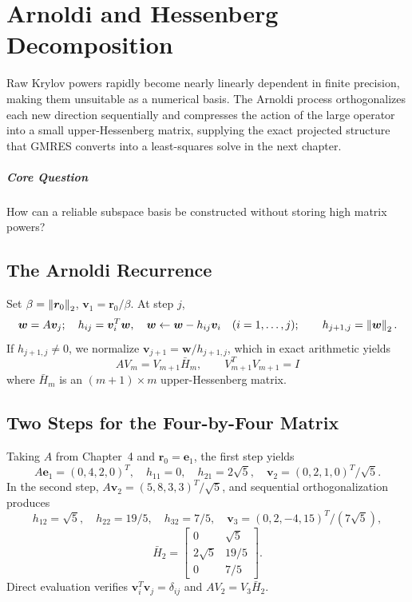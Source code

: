 \chapter{Arnoldi and Hessenberg Decomposition}\label{v0ch:11}
\begin{chaptersummary}
Raw Krylov powers rapidly become nearly linearly dependent in finite precision, making them unsuitable as a numerical basis. The Arnoldi process orthogonalizes each new direction sequentially and compresses the action of the large operator into a small upper-Hessenberg matrix, supplying the exact projected structure that GMRES converts into a least-squares solve in the next chapter.
\end{chaptersummary}
\paragraph{Core Question}How can a reliable subspace basis be constructed without storing high matrix powers?

\section{The Arnoldi Recurrence}
Set $\beta=\left\lVert \bm r_0\right\rVert_2$, $\bm v_1=\bm r_0/\beta$. At step $j$,
\[
 \bm w=A\bm v_j;\quad
 h_{ij}=\bm v_i^T\bm w,\quad
 \bm w\leftarrow\bm w-h_{ij}\bm v_i\quad(i=1,\ldots,j);
 \qquad h_{j+1,j}=\left\lVert \bm w\right\rVert_2.
\]
If $h_{j+1,j}\ne0$, we normalize $\bm v_{j+1}=\bm w/h_{j+1,j}$, which in exact arithmetic yields
\[
 AV_m=V_{m+1}\bar H_m,\qquad V_{m+1}^TV_{m+1}=I
\]
where $\bar H_m$ is an $(m+1)\times m$ upper-Hessenberg matrix.
\section{Two Steps for the Four-by-Four Matrix}
Taking $A$ from Chapter~4 and $\bm r_0=\bm e_1$, the first step yields
\[
 A\bm e_1=(0,4,2,0)^T,\quad h_{11}=0,\quad
 h_{21}=2\sqrt5,\quad
 \bm v_2=(0,2,1,0)^T/\sqrt5.
\]
In the second step, $A\bm v_2=(5,8,3,3)^T/\sqrt5$, and sequential orthogonalization produces
\[
 h_{12}=\sqrt5,\quad h_{22}=19/5,\quad
 h_{32}=7/5,\quad
 \bm v_3=(0,2,-4,15)^T/(7\sqrt5),
\]
\[
 \bar H_2=\begin{bmatrix}0&\sqrt5\\2\sqrt5&19/5\\0&7/5\end{bmatrix}.
\]
Direct evaluation verifies $\bm v_i^T\bm v_j=\delta_{ij}$ and $AV_2=V_3\bar H_2$.

